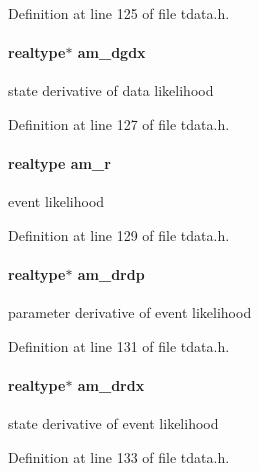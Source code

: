 Definition at line 125 of file tdata.\+h.

\hypertarget{struct_temp_data_ae858332947a50294436a0bbf2b7a8ea1}{}
\paragraph[{am\+\_\+dgdx}]{\setlength{\rightskip}{0pt plus 5cm}realtype$\ast$ am\+\_\+dgdx}\label{struct_temp_data_ae858332947a50294436a0bbf2b7a8ea1}
state derivative of data likelihood 

Definition at line 127 of file tdata.\+h.

\hypertarget{struct_temp_data_a7f00edd52d15fce2def96917a9ee47dc}{}
\paragraph[{am\+\_\+r}]{\setlength{\rightskip}{0pt plus 5cm}realtype am\+\_\+r}\label{struct_temp_data_a7f00edd52d15fce2def96917a9ee47dc}
event likelihood 

Definition at line 129 of file tdata.\+h.

\hypertarget{struct_temp_data_ab9c815d99f44f36f068133746323b5cc}{}
\paragraph[{am\+\_\+drdp}]{\setlength{\rightskip}{0pt plus 5cm}realtype$\ast$ am\+\_\+drdp}\label{struct_temp_data_ab9c815d99f44f36f068133746323b5cc}
parameter derivative of event likelihood 

Definition at line 131 of file tdata.\+h.

\hypertarget{struct_temp_data_a92cb58d44aef5760bf9ad22690e48113}{}
\paragraph[{am\+\_\+drdx}]{\setlength{\rightskip}{0pt plus 5cm}realtype$\ast$ am\+\_\+drdx}\label{struct_temp_data_a92cb58d44aef5760bf9ad22690e48113}
state derivative of event likelihood 

Definition at line 133 of file tdata.\+h.

